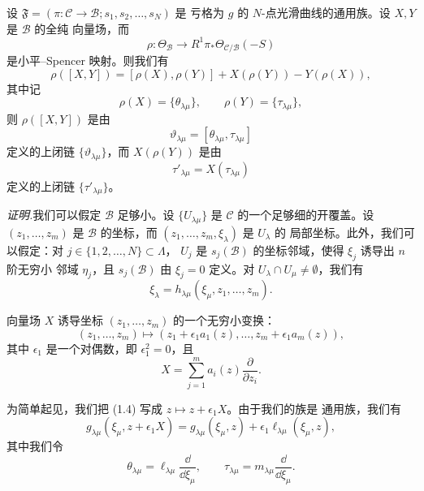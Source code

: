 \begin{lemma}[1.38]
设 $\mathfrak{F}=(\pi:\mathcal{C}\to\mathcal{B};s_1,s_2,\dots,s_N)$ 是
亏格为 $g$ 的 $N$-点光滑曲线的通用族。设 $X,Y$ 是 $\mathcal{B}$ 的全纯
向量场，而
\[
\rho:\Theta_{\mathcal{B}}\to R^1\pi_*\Theta_{\mathcal{C}/\mathcal{B}}(-S)
\]
是小平–Spencer 映射。则我们有
\[
\rho([X,Y])=[\rho(X),\rho(Y)]+X(\rho(Y))-Y(\rho(X)),
\]
其中记
\[
\rho(X)=\{\theta_{\lambda\mu}\},\qquad
\rho(Y)=\{\tau_{\lambda\mu}\},
\]
则 $\rho([X,Y])$ 是由
\[
\vartheta_{\lambda\mu}=[\theta_{\lambda\mu},\tau_{\lambda\mu}]
\]
定义的上闭链 $\{\vartheta_{\lambda\mu}\}$，而 $X(\rho(Y))$ 是由
\[
\tau'_{\lambda\mu}=X(\tau_{\lambda\mu})
\]
定义的上闭链 $\{\tau'_{\lambda\mu}\}$。
\end{lemma}


\noindent\textit{证明.}\quad 我们可以假定 $\mathcal{B}$ 足够小。设 $\{U_{\lambda\mu}\}$
是 $\mathcal{C}$ 的一个足够细的开覆盖。设 $(z_1,\dots,z_m)$ 是
$\mathcal{B}$ 的坐标，而 $(z_1,\dots,z_m,\xi_\lambda)$ 是 $U_\lambda$ 的
局部坐标。此外，我们可以假定：对 $j\in\{1,2,\dots,N\}\subset\Lambda$，
$U_j$ 是 $s_j(\mathcal{B})$ 的坐标邻域，使得 $\xi_j$ 诱导出 $n$ 阶无穷小
邻域 $\eta_j$，且 $s_j(\mathcal{B})$ 由 $\xi_j=0$ 定义。对
$U_\lambda\cap U_\mu\ne\emptyset$，我们有
\[
\xi_\lambda=h_{\lambda\mu}(\xi_\mu,z_1,\dots,z_m).
\]

向量场 $X$ 诱导坐标 $(z_1,\dots,z_m)$ 的一个无穷小变换：
\[
(z_1,\dots,z_m)\longmapsto
(z_1+\epsilon_1a_1(z),\dots,z_m+\epsilon_1a_m(z)),
\]
其中 $\epsilon_1$ 是一个对偶数，即 $\epsilon_1^2=0$，且
\[
X=\sum_{j=1}^{m}a_i(z)\frac{\partial}{\partial z_i}.
\]

为简单起见，我们把 (1.4) 写成 $z\mapsto z+\epsilon_1X$。由于我们的族是
通用族，我们有
\[
g_{\lambda\mu}(\xi_\mu,z+\epsilon_1X)
=g_{\lambda\mu}(\xi_\mu,z)+\epsilon_1\ell_{\lambda\mu}(\xi_\mu,z),
\]
其中我们令
\[
\theta_{\lambda\mu}=\ell_{\lambda\mu}\frac{\dd}{\dd\xi_\mu},\qquad
\tau_{\lambda\mu}=m_{\lambda\mu}\frac{\dd}{\dd\xi_\mu}.
\]

